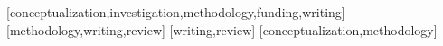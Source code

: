 \documentclass[portuguese]{textolivre}
\begin{document}
\printbibliography\label{sec-bib}
\begin{contributors}
[conceptualization,investigation,methodology,funding,writing]
[methodology,writing,review]
[writing,review]
[conceptualization,methodology]
\end{contributors}
\end{document}
